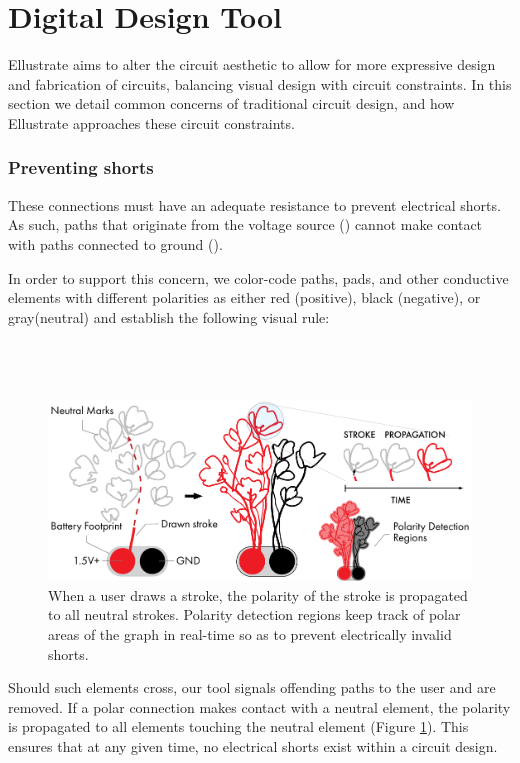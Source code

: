 \documentclass{sigchi}
\begin{document}
\section{Digital Design Tool}
    Ellustrate aims to alter the circuit aesthetic to allow for more expressive design and fabrication of circuits, balancing visual design with circuit constraints. In this section we detail common concerns of traditional circuit design, and how Ellustrate approaches these circuit constraints.

    \subsubsection{Preventing shorts}
    These connections must have an adequate resistance to prevent electrical shorts. As such, paths that originate from the voltage source () cannot make contact with paths connected to ground ().

    In order to support this concern, we color-code paths, pads, and other conductive elements with different polarities as either red (positive), black (negative), or gray(neutral) and establish the following visual rule:
    \\
    \\
    \noindent{}
    \\
    \\
\begin{figure}[h]
\centering
\includegraphics[width=1.0\columnwidth]{figures/propagation.pdf}
\caption{When a user draws a stroke, the polarity of the stroke is propagated to all neutral strokes. Polarity detection regions keep track of polar areas of the graph in real-time so as to prevent electrically invalid shorts.}

\label{fig:propagation}
\end{figure}
    Should such elements cross, our tool signals offending paths to the user and are removed. If a polar connection makes contact with a neutral element, the polarity is propagated to all elements touching the neutral element (Figure \ref{fig:propagation}). This ensures that at any given time, no electrical shorts exist within a circuit design.
\end{document}
